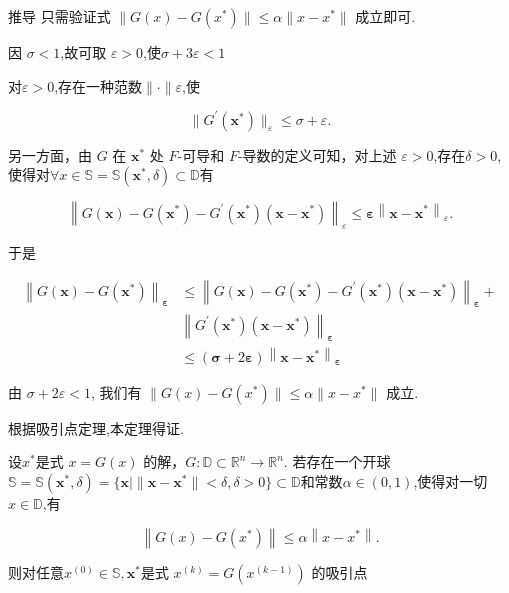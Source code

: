 \documentclass{lzureport}
\begin{document}
\begin{derivation}{推导}
	只需验证式 $\|G(x) - G(x^*)\| \leq \alpha\|x-x^*\|$ 成立即可.
	
	因 $\sigma<1$,故可取 $\varepsilon>0$,使$\sigma + 3\varepsilon <1$

	对$\varepsilon>0$,存在一种范数$\parallel\cdot\parallel\varepsilon$,使 

	$$\|G^{\prime}\left(\boldsymbol{x}^{*}\right)\|_{\varepsilon}\leqslant\sigma+\varepsilon.$$

	另一方面，由 $G$ 在 $\boldsymbol{x}^{*}$ 处 $F$-可导和 $F$-导数的定义可知，对上述 $\varepsilon>0$,存在$\delta>0$,使得对$\forall x\in\mathbb{S}=\mathbb{S}\left(\boldsymbol{x}^*,\delta\right)\subset\mathbb{D}$有

	$$\left\|G(\boldsymbol{x})-G\left(\boldsymbol{x}^*\right)-G^{\prime}\left(\boldsymbol{x}^*\right)\left(\boldsymbol{x}-\boldsymbol{x}^*\right)\right\|_{\varepsilon}\leqslant\boldsymbol{\varepsilon}\left\|\boldsymbol{x}-\boldsymbol{x}^*\right\|_{\varepsilon}.$$

	于是

	$$\begin{aligned}\left\|G(\boldsymbol{x})-G\left(\boldsymbol{x}^*\right)\right\|_{\boldsymbol{\varepsilon}}&\leqslant\left\|G(\boldsymbol{x})-G\left(\boldsymbol{x}^*\right)-G^{\prime}\left(\boldsymbol{x}^*\right)\left(\boldsymbol{x}-\boldsymbol{x}^*\right)\right\|_{\boldsymbol{\varepsilon}}+\\&\left\|G^{\prime}\left(\boldsymbol{x}^*\right)\left(\boldsymbol{x}-\boldsymbol{x}^*\right)\right\|_{\boldsymbol{\varepsilon}}\\&\leqslant(\boldsymbol{\sigma}+2\boldsymbol{\varepsilon})\left\|\boldsymbol{x}-\boldsymbol{x}^*\right\|_{\boldsymbol{\varepsilon}}\end{aligned}$$
	
	由 $\sigma+2\varepsilon<1$, 我们有 $\|G(x) - G(x^*)\| \leq \alpha\|x-x^*\|$ 成立. 
	
	根据吸引点定理,本定理得证.

	\begin{Thm}[吸引点定理]
		设$x^*$是式 $x=G(x)$ 的解，$G:\mathbb{D}\subset\mathbb{R}^n\to\mathbb{R}^n.$
		若存在一个开球$\mathbb{S}=\mathbb{S}\left(\boldsymbol{x}^*,\delta\right)=\{\boldsymbol{x}\mid\|\boldsymbol{x}-\boldsymbol{x}^*\|<\delta,\delta>0\}\subset\mathbb{D}$和常数$\alpha\in(0,1)$,使得对一切 $x\in\mathbb{D}$,有

		$$\left\|G(x)-G\left(x^*\right)\right\|\leqslant\alpha\left\|x-x^*\right\|.$$

		则对任意$x^{(0)}\in\mathbb{S},\boldsymbol{x}^*$是式 $x^{(k)} = G(x^{(k-1)}) $ 的吸引点
	\end{Thm}
	

\end{derivation}
\end{document}
